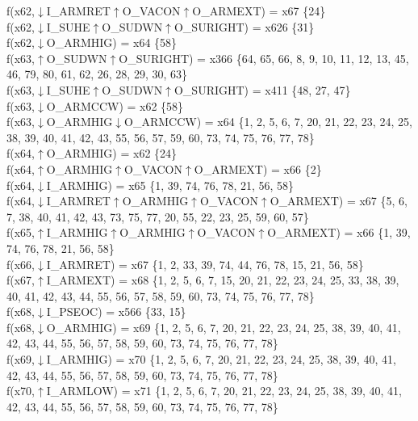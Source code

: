 f(x62,$\downarrow$I\_ARMRET$\uparrow$O\_VACON$\uparrow$O\_ARMEXT) = x67 \{24\} \\  
f(x62,$\downarrow$I\_SUHE$\uparrow$O\_SUDWN$\uparrow$O\_SURIGHT) = x626 \{31\} \\  
f(x62,$\downarrow$O\_ARMHIG) = x64 \{58\} \\  
f(x63,$\uparrow$O\_SUDWN$\uparrow$O\_SURIGHT) = x366 \{64, 65, 66, 8, 9, 10, 11, 12, 13, 45, 46, 79, 80, 61, 62, 26, 28, 29, 30, 63\} \\  
f(x63,$\downarrow$I\_SUHE$\uparrow$O\_SUDWN$\uparrow$O\_SURIGHT) = x411 \{48, 27, 47\} \\  
f(x63,$\downarrow$O\_ARMCCW) = x62 \{58\} \\  
f(x63,$\downarrow$O\_ARMHIG$\downarrow$O\_ARMCCW) = x64 \{1, 2, 5, 6, 7, 20, 21, 22, 23, 24, 25, 38, 39, 40, 41, 42, 43, 55, 56, 57, 59, 60, 73, 74, 75, 76, 77, 78\} \\  
f(x64,$\uparrow$O\_ARMHIG) = x62 \{24\} \\  
f(x64,$\uparrow$O\_ARMHIG$\uparrow$O\_VACON$\uparrow$O\_ARMEXT) = x66 \{2\} \\  
f(x64,$\downarrow$I\_ARMHIG) = x65 \{1, 39, 74, 76, 78, 21, 56, 58\} \\  
f(x64,$\downarrow$I\_ARMRET$\uparrow$O\_ARMHIG$\uparrow$O\_VACON$\uparrow$O\_ARMEXT) = x67 \{5, 6, 7, 38, 40, 41, 42, 43, 73, 75, 77, 20, 55, 22, 23, 25, 59, 60, 57\} \\  
f(x65,$\uparrow$I\_ARMHIG$\uparrow$O\_ARMHIG$\uparrow$O\_VACON$\uparrow$O\_ARMEXT) = x66 \{1, 39, 74, 76, 78, 21, 56, 58\} \\  
f(x66,$\downarrow$I\_ARMRET) = x67 \{1, 2, 33, 39, 74, 44, 76, 78, 15, 21, 56, 58\} \\  
f(x67,$\uparrow$I\_ARMEXT) = x68 \{1, 2, 5, 6, 7, 15, 20, 21, 22, 23, 24, 25, 33, 38, 39, 40, 41, 42, 43, 44, 55, 56, 57, 58, 59, 60, 73, 74, 75, 76, 77, 78\} \\  
f(x68,$\downarrow$I\_PSEOC) = x566 \{33, 15\} \\  
f(x68,$\downarrow$O\_ARMHIG) = x69 \{1, 2, 5, 6, 7, 20, 21, 22, 23, 24, 25, 38, 39, 40, 41, 42, 43, 44, 55, 56, 57, 58, 59, 60, 73, 74, 75, 76, 77, 78\} \\  
f(x69,$\downarrow$I\_ARMHIG) = x70 \{1, 2, 5, 6, 7, 20, 21, 22, 23, 24, 25, 38, 39, 40, 41, 42, 43, 44, 55, 56, 57, 58, 59, 60, 73, 74, 75, 76, 77, 78\} \\  
f(x70,$\uparrow$I\_ARMLOW) = x71 \{1, 2, 5, 6, 7, 20, 21, 22, 23, 24, 25, 38, 39, 40, 41, 42, 43, 44, 55, 56, 57, 58, 59, 60, 73, 74, 75, 76, 77, 78\} \\  
